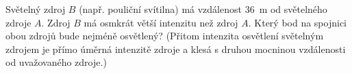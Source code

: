 \begin{mdframed}[style=mdexam]
  \begin{example}\label{teo:exam093}
    Světelný zdroj \(B\) (např. pouliční svítilna) má vzdálenost \SI{36}{\m} od světelného zdroje
    \(A\). Zdroj \(B\) má osmkrát větší intenzitu než zdroj \(A\). Který bod na spojnici obou zdrojů
    bude nejméně osvětlený? (Přitom intenzita osvětlení světelným zdrojem je přímo úměrná intenzitě
    zdroje a klesá s druhou mocninou vzdálenosti od uvažovaného zdroje.)

    {\centering
      \captionsetup{type=figure}
      \label{mai:fig063}
    \par}      


\end{example}
\end{mdframed}
